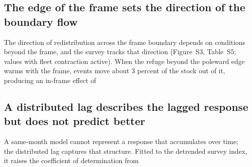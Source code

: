\documentclass[11pt,a4paper]{article}
\begin{document}
\subsection{The edge of the frame sets the direction of the boundary flow}
\label{sec:res-frame}

The direction of redistribution across the frame boundary depends on conditions beyond the frame, and the survey tracks that direction (Figure~S3, Table~S5; values with fleet contraction active). When the refuge beyond the poleward edge warms with the frame, events move about 3 percent of the stock out of it, producing an in-frame effect of %

\subsection{A distributed lag describes the lagged response but does not predict better}
\label{sec:res-temporal}

A same-month model cannot represent a response that accumulates over time; the distributed lag captures that structure. Fitted to the detrended survey index, it raises the coefficient of determination from %
\end{document}
